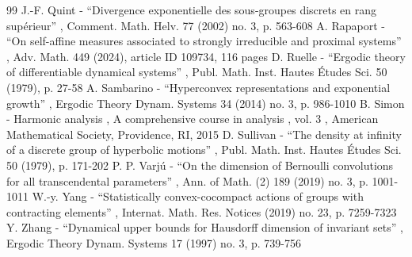 \begin{thebibliography}{99}
 J.-F. Quint - “Divergence exponentielle des sous-groupes discrets en rang supérieur” , Comment. Math. Helv. 77 (2002) no. 3, p. 563-608
 A. Rapaport - “On self-affine measures associated to strongly irreducible and proximal systems” , Adv. Math. 449 (2024), article ID 109734, 116 pages
 D. Ruelle - “Ergodic theory of differentiable dynamical systems” , Publ. Math. Inst. Hautes Études Sci. 50 (1979), p. 27-58
 A. Sambarino - “Hyperconvex representations and exponential growth” , Ergodic Theory Dynam. Systems 34 (2014) no. 3, p. 986-1010
 B. Simon - Harmonic analysis , A comprehensive course in analysis , vol. 3 , American Mathematical Society, Providence, RI, 2015
 D. Sullivan - “The density at infinity of a discrete group of hyperbolic motions” , Publ. Math. Inst. Hautes Études Sci. 50 (1979), p. 171-202
 P. P. Varjú - “On the dimension of Bernoulli convolutions for all transcendental parameters” , Ann. of Math. (2) 189 (2019) no. 3, p. 1001-1011
 W.-y. Yang - “Statistically convex-cocompact actions of groups with contracting elements” , Internat. Math. Res. Notices (2019) no. 23, p. 7259-7323
 Y. Zhang - “Dynamical upper bounds for Hausdorff dimension of invariant sets” , Ergodic Theory Dynam. Systems 17 (1997) no. 3, p. 739-756
\end{thebibliography}
